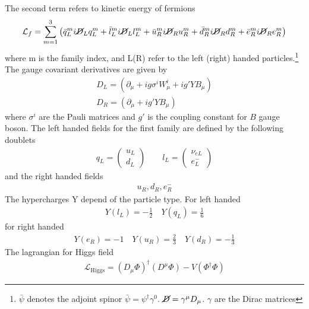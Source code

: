 The second term refers to kinetic energy of fermions 
\begin{align}
\mathcal{L}_f=\sum_{m=1}^{3} \left(\bar{q}^m_{L}i \cancel{D}_L q^m_{L}+ 
\bar{l}^m_{L}i \cancel{D}_L l^m_{L} +\bar{u}_{R}^m i \cancel{D}_R u_{R}^m
+\bar{d}_{R}^m i \cancel{D}_R d_{R}^m+\bar{e}_{R}^m i \cancel{D}_R e_{R}^m \right)
\end{align}
where m is the family index, and L(R)
refer to the left (right) handed particles.\footnote{$\bar{\psi}$ denotes the adjoint spinor $\bar{\psi}=\psi^\dagger \gamma^0$.
$\cancel{D}=\gamma^\mu D_\mu$. $\gamma$ are the Dirac matrices}
The gauge covariant derivatives are given by
\begin{align}
{D}_L =\left(\partial_\mu+ig\sigma^iW^i_\mu +ig'Y B_\mu\right)\\
{D}_R =\left(\partial_\mu +ig' Y B_\mu\right)
\end{align}
where $\sigma^i$ are the Pauli matrices and $g'$ is the coupling constant for $B$ gauge boson. %
The left handed fields for the first family are defined by the following doublets
\begin{align}
  q_L=\left(\begin{array}{c}
 u_L \\
d_L
\end{array} \right) \qquad  l_L=\left(\begin{array}{c}
 \nu_{eL} \\
e^-_L
\end{array} \right)
\end{align}
and the right handed fields
\begin{align}
  u_R, d_R, e^-_R 
\end{align}
The hypercharges Y depend of the particle type. For left handed 
\begin{align}
  Y(l_L)=-\frac{1}{2} \quad Y(q_L)=\frac{1}{6} 
 \end{align}
 for right handed 
 \begin{align}
Y(e_R)=-1 \quad Y(u_R)=\frac{2}{3} \quad Y(d_R)=-\frac{1}{3}
\end{align}
The lagrangian for Higgs field
\begin{align}
\mathcal{L}_{\text{Higgs}}=(D_\mu \Phi)^\dagger (D^\mu \Phi)-V(\Phi^\dagger \Phi)
\end{align}
